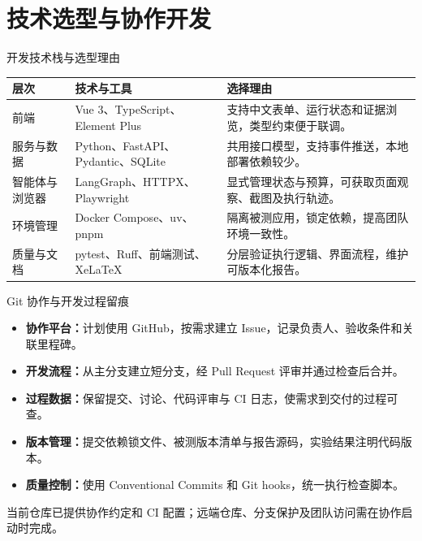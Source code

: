 \section{技术选型与协作开发}
\begin{frame}{开发技术栈与选型理由}
\small
\begin{tabularx}{\textwidth}{lXX}
\toprule
层次 & 技术与工具 & 选择理由 \\
\midrule
前端 & Vue 3、TypeScript、Element Plus & 支持中文表单、运行状态和证据浏览，类型约束便于联调。\\
服务与数据 & Python、FastAPI、Pydantic、SQLite & 共用接口模型，支持事件推送，本地部署依赖较少。\\
智能体与浏览器 & LangGraph、HTTPX、Playwright & 显式管理状态与预算，可获取页面观察、截图及执行轨迹。\\
环境管理 & Docker Compose、uv、pnpm & 隔离被测应用，锁定依赖，提高团队环境一致性。\\
质量与文档 & pytest、Ruff、前端测试、XeLaTeX & 分层验证执行逻辑、界面流程，维护可版本化报告。\\
\bottomrule
\end{tabularx}
\end{frame}

\begin{frame}{Git 协作与开发过程留痕}
\begin{itemize}
\item \textbf{协作平台：}计划使用 GitHub，按需求建立 Issue，记录负责人、验收条件和关联里程碑。
\item \textbf{开发流程：}从主分支建立短分支，经 Pull Request 评审并通过检查后合并。
\item \textbf{过程数据：}保留提交、讨论、代码评审与 CI 日志，使需求到交付的过程可查。
\item \textbf{版本管理：}提交依赖锁文件、被测版本清单与报告源码，实验结果注明代码版本。
\item \textbf{质量控制：}使用 Conventional Commits 和 Git hooks，统一执行检查脚本。
\end{itemize}
\vfill
\small 当前仓库已提供协作约定和 CI 配置；远端仓库、分支保护及团队访问需在协作启动时完成。
\end{frame}
